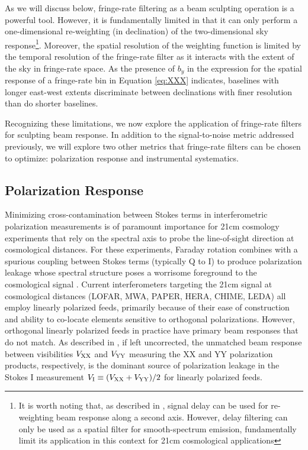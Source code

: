 \documentclass[twocolumn,apj,numberedappendix]{emulateapj}
\begin{document}
As we will discuss below, fringe-rate filtering as a beam sculpting operation is a powerful tool.  However, it
is fundamentally limited in that it can only perform a one-dimensional re-weighting (in declination) of 
the two-dimensional sky response\footnote{It is worth noting that, as described in \citet{parsons_backer2009},
signal delay can be used for re-weighting beam response along a second axis.  However, delay filtering can only
be used as a spatial filter for smooth-spectrum emission, fundamentally limit its application in this
context for 21cm cosmological applications}.  Moreover, the spatial resolution of the weighting function is limited by
the temporal resolution of the fringe-rate filter as it interacts with the extent of the sky in fringe-rate space.
As the presence of $b_y$ in the expression for the spatial response of a fringe-rate bin in Equation \ref{eq:XXX} indicates,
baselines with longer east-west extents discriminate between declinations with finer resolution than do shorter
baselines.

Recognizing these limitations, we now explore the application of fringe-rate filters for sculpting beam response.
In addition to the signal-to-noise metric addressed previously, we will explore two other metrics that fringe-rate
filters can be chosen to optimize: polarization response and instrumental systematics.

\subsection{Polarization Response}
\label{sec:polbeams}
\def\VXX{{V_{\rm XX}}}
\def\VYY{{V_{\rm YY}}}
\def\VI{{V_{\rm I}}}
\def\VQ{{V_{\rm Q}}}

Minimizing cross-contamination between Stokes terms in interferometric polarization measurements
is of paramount importance for 21cm cosmology experiments that rely on
the spectral axis to probe the line-of-sight direction at cosmological distances.  For these
experiments, Faraday rotation combines
with a spurious coupling between Stokes terms (typically Q to I) to produce polarization leakage whose 
spectral structure poses a worrisome foreground
to the cosmological signal \citep{jelic_et_al2008,bernardi,moore_et_al2013,moore_et_al2015}.  Current interferometers
targeting the 21cm signal at cosmological distances (LOFAR, MWA, PAPER, HERA, CHIME, LEDA) all employ linearly
polarized feeds, primarily because of their ease of construction and ability to co-locate elements sensitive to
orthogonal polarizations.  However, orthogonal linearly polarized feeds in practice have primary beam responses
that do not match.  As described in \citet{moore_et_al2013}, if left uncorrected, the unmatched beam response 
between visibilities $\VXX$ and $\VYY$ measuring the XX and YY polarization products, respectively, is the 
dominant source of polarization leakage in the Stokes I measurement $\VI\equiv(\VXX+\VYY)/2$ for
linearly polarized feeds.
\end{document}

